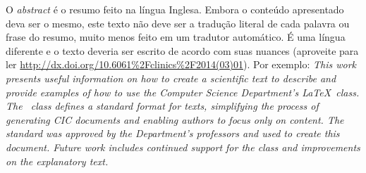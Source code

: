 O \emph{abstract} é o resumo feito na língua Inglesa. Embora o conteúdo apresentado
deva ser o mesmo, este texto não deve ser a tradução literal de cada palavra ou
frase do resumo, muito menos feito em um tradutor automático. É uma língua
diferente e o texto deveria ser escrito de acordo com suas nuances (aproveite para ler
\url{http://dx.doi.org/10.6061%2Fclinics%2F2014(03)01}). Por exemplo: \emph{This work presents useful information on how to create a scientific text to describe
and provide examples of how to use the Computer Science Department's \LaTeX\ class. The \unbcic\
class defines a standard format for texts, simplifying the process of generating
CIC documents and enabling authors to focus only on content. The standard was approved
by the Department's professors and used to create this document. Future work includes
continued support for the class and improvements on the explanatory text.}
